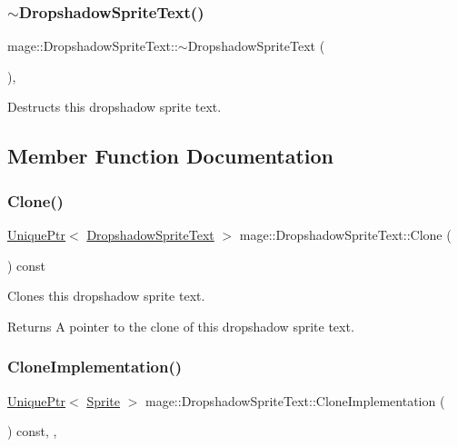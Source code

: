 \subsubsection{\texorpdfstring{$\sim$\+Dropshadow\+Sprite\+Text()}{~DropshadowSpriteText()}}
{\footnotesize\ttfamily mage\+::\+Dropshadow\+Sprite\+Text\+::$\sim$\+Dropshadow\+Sprite\+Text (\begin{DoxyParamCaption}{ }\end{DoxyParamCaption})\hspace{0.3cm}{\ttfamily [virtual]}, {\ttfamily [default]}}

Destructs this dropshadow sprite text. 

\subsection{Member Function Documentation}
\hypertarget{classmage_1_1_dropshadow_sprite_text_a0dcce82b4a83fbd469d68adba21af220}{}\label{classmage_1_1_dropshadow_sprite_text_a0dcce82b4a83fbd469d68adba21af220} 
\subsubsection{\texorpdfstring{Clone()}{Clone()}}
{\footnotesize\ttfamily \hyperlink{namespacemage_a3316d7143a973e37adf1110f2e80ca31}{Unique\+Ptr}$<$ \hyperlink{classmage_1_1_dropshadow_sprite_text}{Dropshadow\+Sprite\+Text} $>$ mage\+::\+Dropshadow\+Sprite\+Text\+::\+Clone (\begin{DoxyParamCaption}{ }\end{DoxyParamCaption}) const}

Clones this dropshadow sprite text.

\begin{DoxyReturn}{Returns}
A pointer to the clone of this dropshadow sprite text. 
\end{DoxyReturn}
\hypertarget{classmage_1_1_dropshadow_sprite_text_af997217dd243061e0490bbcd4bfde7ed}{}\label{classmage_1_1_dropshadow_sprite_text_af997217dd243061e0490bbcd4bfde7ed} 
\subsubsection{\texorpdfstring{Clone\+Implementation()}{CloneImplementation()}}
{\footnotesize\ttfamily \hyperlink{namespacemage_a3316d7143a973e37adf1110f2e80ca31}{Unique\+Ptr}$<$ \hyperlink{classmage_1_1_sprite}{Sprite} $>$ mage\+::\+Dropshadow\+Sprite\+Text\+::\+Clone\+Implementation (\begin{DoxyParamCaption}{ }\end{DoxyParamCaption}) const\hspace{0.3cm}{\ttfamily [override]}, {\ttfamily [private]}, {\ttfamily [virtual]}}

